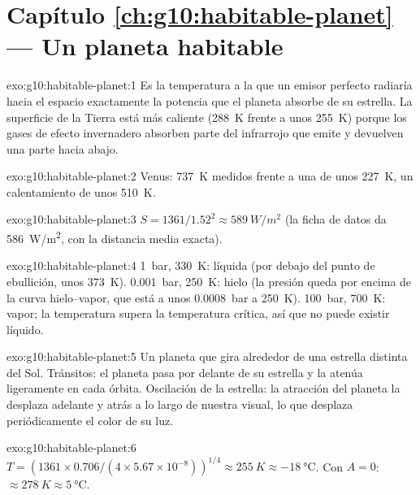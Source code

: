 \section*{Capítulo \ref{ch:g10:habitable-planet} --- Un planeta habitable}

\begin{solution}{exo:g10:habitable-planet:1}
Es la temperatura a la que un emisor perfecto radiaría hacia el espacio
exactamente la potencia que el planeta absorbe de su estrella. La superficie
de la Tierra está más caliente (\qty{288}{K} frente a unos \qty{255}{K})
porque los gases de efecto invernadero absorben parte del infrarrojo que
emite y devuelven una parte hacia abajo.
\end{solution}

\begin{solution}{exo:g10:habitable-planet:2}
Venus: \qty{737}{K} medidos frente a una  de unos
\qty{227}{K}, un calentamiento de unos \qty{510}{K}.
\end{solution}

\begin{solution}{exo:g10:habitable-planet:3}
$S = 1361/1.52^2 \approx \qty{589}{W/m^2}$ (la ficha de datos da
\qty{586}{W/m^2}, con la distancia media exacta).
\end{solution}

\begin{solution}{exo:g10:habitable-planet:4}
\qty{1}{bar}, \qty{330}{K}: líquida (por debajo del punto de ebullición,
unos \qty{373}{K}). \qty{0.001}{bar}, \qty{250}{K}: hielo (la presión queda
por encima de la curva hielo--vapor, que está a unos \qty{0.0008}{bar} a
\qty{250}{K}). \qty{100}{bar}, \qty{700}{K}: vapor; la temperatura supera la
temperatura crítica, así que no puede existir líquido.
\end{solution}

\begin{solution}{exo:g10:habitable-planet:5}
Un planeta que gira alrededor de una estrella distinta del Sol. Tránsitos:
el planeta pasa por delante de su estrella y la atenúa ligeramente en cada
órbita. Oscilación de la estrella: la atracción del planeta la desplaza
adelante y atrás a lo largo de nuestra visual, lo que desplaza
periódicamente el color de su luz.
\end{solution}

\begin{solution}{exo:g10:habitable-planet:6}
$T = (1361 \times 0.706/(4 \times 5.67\times10^{-8}))^{1/4} \approx
\qty{255}{K} \approx \qty{-18}{\degreeCelsius}$. Con $A = 0$:
$\approx \qty{278}{K} \approx \qty{5}{\degreeCelsius}$.
\end{solution}

